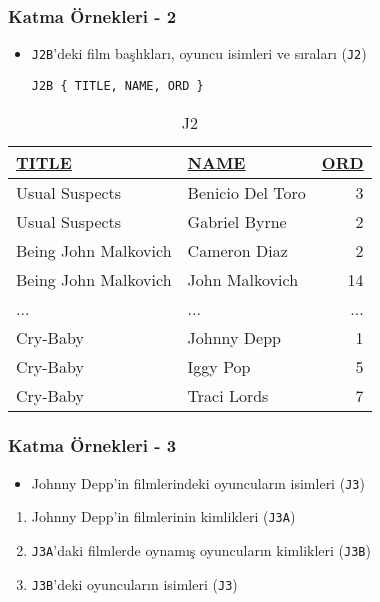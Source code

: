 \documentclass[dvipsnames]{beamer}
\theoremstyle{plain}
\begin{document}
\begin{frame}[fragile]
  \frametitle{Katma Örnekleri - 2}

    \begin{itemize}
      \item \texttt{J2B}'deki film başlıkları, oyuncu isimleri ve sıraları
        (\texttt{J2})

    \begin{lstlisting}
J2B { TITLE, NAME, ORD }
    \end{lstlisting}
    \end{itemize}

    \vspace{-10pt}
    \begin{tiny}
    \begin{table}
      \caption{J2}
      \begin{tabular}{|l|l|r|}\hline
\underline{TITLE}    & \underline{NAME} & \underline{ORD}\\[2pt]\hline\hline
Usual Suspects       & Benicio Del Toro &   3\\\hline
Usual Suspects       & Gabriel Byrne    &   2\\\hline
Being John Malkovich & Cameron Diaz     &   2\\\hline
Being John Malkovich & John Malkovich   &  14\\\hline
...                  & ...              & ...\\\hline
Cry-Baby             & Johnny Depp      &   1\\\hline
Cry-Baby             & Iggy Pop         &   5\\\hline
Cry-Baby             & Traci Lords      &   7\\\hline
      \end{tabular}
    \end{table}
    \end{tiny}
\end{frame}

\begin{frame}
  \frametitle{Katma Örnekleri - 3}

    \begin{itemize}
      \item Johnny Depp'in filmlerindeki oyuncuların isimleri (\texttt{J3})
    \end{itemize}

    \pause
    \begin{enumerate}
      \item Johnny Depp'in filmlerinin kimlikleri (\texttt{J3A})
      \item  \texttt{J3A}'daki filmlerde oynamış oyuncuların kimlikleri
        (\texttt{J3B})
      \item \texttt{J3B}'deki oyuncuların isimleri (\texttt{J3})
    \end{enumerate}
\end{frame}
\end{document}

